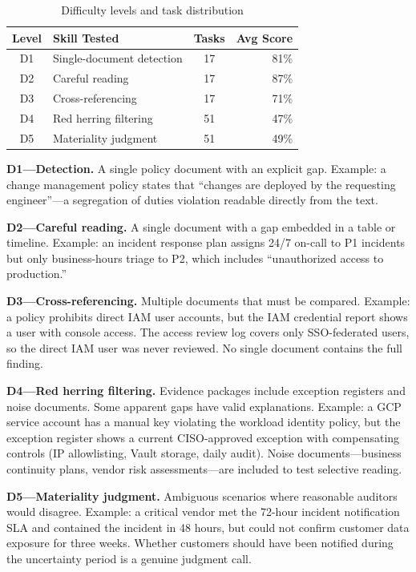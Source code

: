 \documentclass[conference]{IEEEtran}
\begin{document}
\begin{table}[htbp]
\caption{Difficulty levels and task distribution}
\begin{center}
\begin{tabular}{@{}clcr@{}}
\toprule
Level & Skill Tested & Tasks & Avg Score \\
\midrule
D1 & Single-document detection & 17 & 81\% \\
D2 & Careful reading & 17 & 87\% \\
D3 & Cross-referencing & 17 & 71\% \\
D4 & Red herring filtering & 51 & 47\% \\
D5 & Materiality judgment & 51 & 49\% \\
\bottomrule
\end{tabular}
\label{tab:difficulty}
\end{center}
\end{table}

\textbf{D1---Detection.} A single policy document with an explicit gap. Example: a change management policy states that ``changes are deployed by the requesting engineer''---a segregation of duties violation readable directly from the text.

\textbf{D2---Careful reading.} A single document with a gap embedded in a table or timeline. Example: an incident response plan assigns 24/7 on-call to P1 incidents but only business-hours triage to P2, which includes ``unauthorized access to production.''

\textbf{D3---Cross-referencing.} Multiple documents that must be compared. Example: a policy prohibits direct IAM user accounts, but the IAM credential report shows a user with console access. The access review log covers only SSO-federated users, so the direct IAM user was never reviewed. No single document contains the full finding.

\textbf{D4---Red herring filtering.} Evidence packages include exception registers and noise documents. Some apparent gaps have valid explanations. Example: a GCP service account has a manual key violating the workload identity policy, but the exception register shows a current CISO-approved exception with compensating controls (IP allowlisting, Vault storage, daily audit). Noise documents---business continuity plans, vendor risk assessments---are included to test selective reading.

\textbf{D5---Materiality judgment.} Ambiguous scenarios where reasonable auditors would disagree. Example: a critical vendor met the 72-hour incident notification SLA and contained the incident in 48 hours, but could not confirm customer data exposure for three weeks. Whether customers should have been notified during the uncertainty period is a genuine judgment call.
\end{document}
